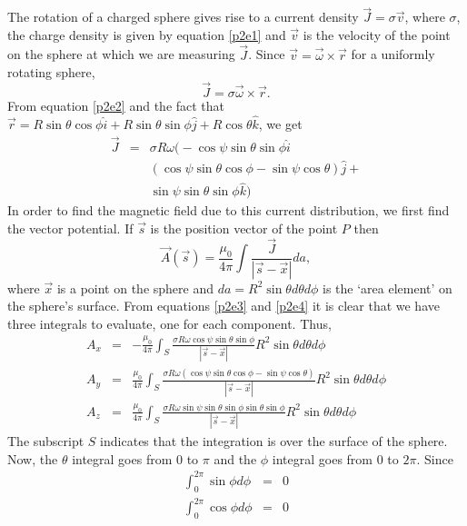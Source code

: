 \documentclass{article}
\begin{document}
\begin{enumerate}
The rotation of a charged sphere gives rise to a current density $\vec{J} = 
\sigma\vec{v}$, where $\sigma$, the charge density is given by equation 
\eqref{p2e1} and $\vec{v}$ is the velocity of the point on the sphere at 
which we are measuring $\vec{J}$. Since $\vec{v} = \vec{\omega}\times\vec{r}$
for a uniformly rotating sphere,
\[
\vec{J} = \sigma\vec{\omega} \times \vec{r}.
\]
From equation \eqref{p2e2} and the fact that $\vec{r} = R\sin\theta\cos\phi
\hat{i} + R\sin\theta\sin\phi\hat{j} + R\cos\theta\hat{k}$, we get
\begin{eqnarray}
\vec{J}&=&\sigma R\omega\Big(-\cos\psi\sin\theta\sin\phi\hat{i} \nonumber \\
 & & (\cos\psi\sin\theta \cos\phi - \sin\psi\cos\theta)\hat{j} + \nonumber  \\
 & & \sin\psi\sin\theta\sin\phi\hat{k}\Big)\label{p2e3}
\end{eqnarray}
In order to find the magnetic field due to this current distribution, we 
first find the vector potential. If $\vec{s}$ is the position vector of
the point $P$ then 
\begin{equation}\label{p2e4}
\vec{A}(\vec{s}) = \frac{\mu_0}{4\pi}\int\frac{\vec{J}}{|\vec{s} - \vec{x}|}
da,
\end{equation}
where $\vec{x}$ is a point on the sphere and $da = R^2\sin\theta d\theta d\phi$
is the `area element' on the sphere's surface. From equations \eqref{p2e3}
and \eqref{p2e4} it is clear that we have three integrals to evaluate, one for 
each component. Thus,
\begin{eqnarray}
A_x &=& -\frac{\mu_0}{4\pi}\int_{S}\frac{\sigma R\omega\cos\psi\sin\theta\sin\phi}
{|\vec{s} - \vec{x}|} R^2\sin\theta d\theta d\phi \label{p2e5} \\
A_y &=& \frac{\mu_0}{4\pi}\int_{S}\frac{\sigma R\omega(\cos\psi\sin\theta \cos\phi - \sin\psi\cos\theta)}
{|\vec{s} - \vec{x}|} R^2\sin\theta d\theta d\phi \label{p2e6} \\
A_z &=& \frac{\mu_0}{4\pi}\int_{S}\frac{\sigma R\omega\sin\psi\sin\theta\sin\phi\sin\theta\sin\phi}
{|\vec{s} - \vec{x}|} R^2\sin\theta d\theta d\phi \label{p2e7} 
\end{eqnarray}
The subscript $S$ indicates that the integration is over the surface of the
sphere. Now, the $\theta$ integral goes from $0$ to $\pi$ and the $\phi$ 
integral goes from $0$ to $2\pi$. Since
\begin{eqnarray*}
\int_0^{2\pi}\sin\phi d\phi &=& 0 \\
\int_0^{2\pi}\cos\phi d\phi &=& 0
\end{eqnarray*}

\end{enumerate}
\end{document}
